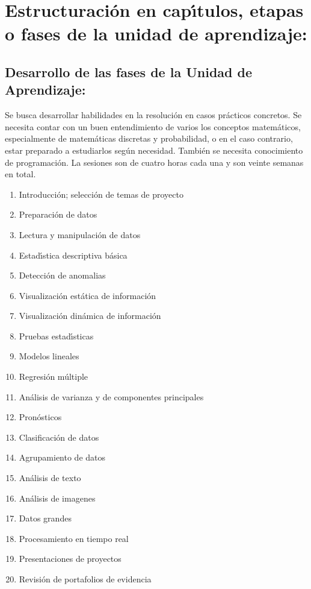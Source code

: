 \documentclass[10 pt]{article}
\begin{document}
\newpage

\section{Estructuraci\'{o}n en cap\'{\i}tulos, etapas o fases de la unidad de
  aprendizaje:}
\subsection{Desarrollo de las fases de la Unidad de Aprendizaje:}

Se busca desarrollar habilidades en la resoluci\'{o}n en casos
pr\'{a}cticos concretos. Se necesita contar con un buen entendimiento
de varios los conceptos matem\'{a}ticos, especialmente de
matem\'{a}ticas discretas y probabilidad, o en el caso contrario,
estar preparado a estudiarlos seg\'{u}n necesidad. Tambi\'{e}n se
necesita conocimiento de programaci\'{o}n.  La sesiones son de cuatro
horas cada una y son veinte semanas en total.
\begin{enumerate}[itemsep=-3pt]
\item{Introducci\'{o}n; selecci\'{o}n de temas de proyecto}
\item{Preparaci\'{o}n de datos}
\item{Lectura y manipulaci\'{o}n de datos}
\item{Estad\'{\i}stica descriptiva b\'{a}sica}
\item{Detecci\'{o}n de anomalias}
\item{Visualizaci\'{o}n est\'{a}tica de informaci\'{o}n}
\item{Visualizaci\'{o}n din\'{a}mica de informaci\'{o}n}
\item{Pruebas estad\'{\i}sticas}
\item{Modelos lineales}
\item{Regresi\'{o}n m\'{u}ltiple}
\item{An\'{a}lisis de varianza y de componentes principales}
\item{Pron\'{o}sticos}
\item{Clasificaci\'{o}n de datos}
\item{Agrupamiento de datos}
\item{An\'{a}lisis de texto}
\item{An\'{a}lisis de imagenes}
\item{Datos grandes}
\item{Procesamiento en tiempo real}
\item{Presentaciones de proyectos}
\item{Revisi\'{o}n de portafolios de evidencia}
\end{enumerate}
\end{document}
